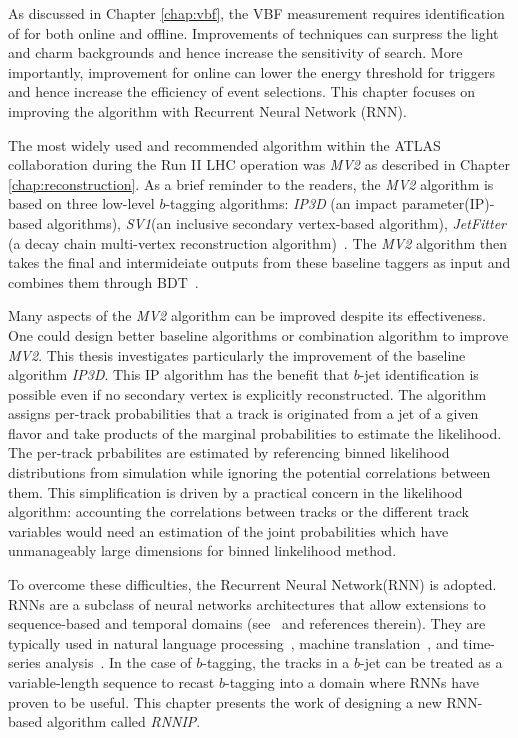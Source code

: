 As discussed in Chapter \ref{chap:vbf}, the VBF \Hbb measurement requires identification of \bjets for both online and offline. Improvements of \btagging techniques can surpress the light and charm backgrounds and hence increase the sensitivity of \Hbb search. More importantly, improvement for online \btagging can lower the energy threshold for \bjet triggers and hence increase the efficiency of \Hbb event selections. This chapter focuses on improving the \btagging algorithm with Recurrent Neural Network (RNN). 

The most widely used and recommended \btagging algorithm within the ATLAS collaboration during the Run II LHC operation was \textit{MV2} as described in Chapter \ref{chap:reconstruction}. As a brief reminder to the readers, the \textit{MV2} algorithm is based on three low-level $b$-tagging algorithms: \textit{IP3D} (an impact parameter(IP)-based algorithms), \textit{SV1}(an inclusive secondary vertex-based algorithm), \textit{JetFitter} (a decay chain multi-vertex reconstruction algorithm)~\cite{ref:btagPaper}. The \textit{MV2} algorithm then takes the final and intermideiate outputs from these baseline taggers as input and combines them through BDT~\cite{ATL-PHYS-PUB-2016-012}.

Many aspects of the \textit{MV2} algorithm can be improved despite its effectiveness. One could design better baseline algorithms or combination algorithm to improve \textit{MV2}. This thesis investigates particularly the improvement of the baseline algorithm \textit{IP3D}. This IP algorithm has the benefit that $b$-jet identification is possible even if no secondary vertex is explicitly reconstructed. The algorithm assigns per-track probabilities that a track is originated from a jet of a given flavor and take products of the marginal probabilities to estimate the likelihood. The per-track prbabilites are estimated by referencing binned likelihood distributions from simulation while ignoring the potential correlations between them. This simplification is driven by a practical concern in the likelihood algorithm: accounting the correlations between tracks or the different track variables would need an estimation of the joint probabilities which have unmanageably large dimensions for binned linkelihood method.

To overcome these difficulties, the Recurrent Neural Network(RNN) is adopted. RNNs are a subclass of neural networks architectures that allow extensions to sequence-based and temporal domains (see~\cite{ref:RNNthesis} and references therein). They are typically used in natural language processing~\cite{languagemodel,DBLP:journals/corr/abs-1303-5778}, machine translation~\cite{MT,MT2}, and time-series analysis~\cite{timeseries,timeseries2}. In the case of $b$-tagging, the tracks in a $b$-jet can be treated as a variable-length sequence to recast $b$-tagging into a domain where RNNs have proven to be useful. This chapter presents the work of designing a new RNN-based \btagging algorithm called \textit{RNNIP}.

